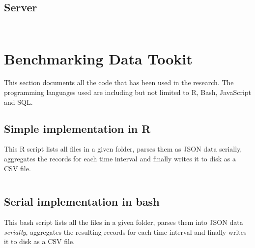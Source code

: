 \subsection{Server} \label{appendix:pilot:server}
\vspace{1em}
\inputminted{javascript}{tools/pilot/server-package.json}
\inputminted{javascript}{tools/pilot/server-server.js}

\section{Benchmarking Data Tookit} \label{appendix:benchmark}

This section documents all the code that has been used in the research.
The programming languages used are including but not limited to R, Bash, JavaScript and SQL.

\subsection{Simple implementation in R}
This R script lists all files in a given folder, parses them as JSON data serially, aggregates the records for each time interval and finally writes it to disk as a CSV file.
\vspace{1em}
\inputminted{R}{analysis/data-toolkit/old-toolkit.r}

\subsection{Serial implementation in bash}
This bash script lists all the files in a given folder, parses them into JSON data \textit{serially}, aggregates the resulting records for each time interval and finally writes it to disk as a CSV file.
\vspace{1em}
\inputminted{bash}{analysis/data-toolkit/new-toolkit.sh}

